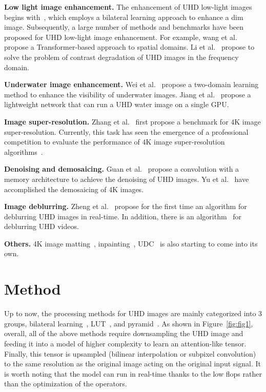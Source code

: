 \documentclass{article}
\begin{document}
\noindent \textbf{Low light image enhancement.}
%
The enhancement of UHD low-light images begins with~\cite{lin2022uhd}, which employs a bilateral learning approach to enhance a dim image.
%
Subsequently, a large number of methods and benchmarks have been proposed for UHD low-light image enhancement.
%
For example, wang et al.~\cite{wang2023ultra} propose a Transformer-based approach to spatial domains.
%
Li et al.~\cite{li2023embedding} propose to solve the problem of contrast degradation of UHD images in the frequency domain.
%

\noindent \textbf{Underwater image enhancement.}
%
Wei et al.~\cite{wei2022uhd} propose a two-domain learning method to enhance the visibility of underwater images. Jiang et al.~\cite{jiang2023five} propose a lightweight network that can run a UHD water image on a single GPU.

\noindent \textbf{Image super-resolution.}
%
Zhang et al.~\cite{zhang2021benchmarking} first propose a benchmark for 4K image super-resolution.
%
Currently, this task has seen the emergence of a professional competition to evaluate the performance of 4K image super-resolution algorithms~\cite{zamfir2023towards,conde2023efficient,gankhuyag2023lightweight}.
	
	
\noindent \textbf{Denoising and demosaicing.}
%
Guan et al.~\cite{guan2022memory} propose a convolution with a memory architecture to achieve the denoising of UHD images.
%
Yu et al.~\cite{yu2022towards} have accomplished the demosaicing of 4K images.

\noindent \textbf{Image deblurring.}
%
Zheng et al.~\cite{zheng2022uhd} propose for the first time an algorithm for deblurring UHD images in real-time.
%
In addition, there is an algorithm~\cite{deng2021multi} for deblurring UHD videos.

\noindent \textbf{Others.}
%
4K image matting~\cite{sun2023ultrahigh}, inpainting~\cite{schrader2023efficient}, UDC~\cite{luo2022under,zhengimage} is also starting to come into its own.


\section{Method}
%
Up to now, the processing methods for UHD images are mainly categorized into 3 groups, bilateral learning~\cite{zheng2021ultra,gharbi2017deep,zheng2021ultra1,wang2023lgabl,lin2022uhd,xu2023direction,xia2020joint,xu2021bilateral,zhou20234k}, LUT~\cite{yang2022seplut,jiang2023meflut,zhang2022dualbln,yang2022adaint,liu20234d,wang2021real,li2022mulut,jo2021practical}, and pyramid~\cite{xiao2024single,jiang2023five,liang2021high}.
%
As shown in Figure~\ref{fig:fig1}, overall, all of the above methods require downsampling the UHD image and feeding it into a model of higher complexity to learn an attention-like tensor.
%
Finally, this tensor is upsampled (bilinear interpolation or subpixel convolution) to the same resolution as the original image acting on the original input signal.
%
It is worth noting that the model can run in real-time thanks to the low flops rather than the optimization of the operators.
%
\end{document}
